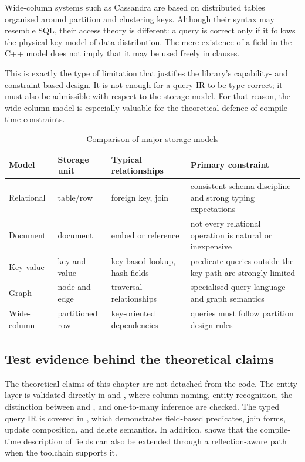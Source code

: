 Wide-column systems such as Cassandra are based on distributed tables organised around partition and clustering keys. Although their syntax may resemble SQL, their access theory is different: a query is correct only if it follows the physical key model of data distribution. The mere existence of a field in the C++ model does not imply that it may be used freely in  clauses.

This is exactly the type of limitation that justifies the library's capability- and constraint-based design. It is not enough for a query IR to be type-correct; it must also be admissible with respect to the storage model. For that reason, the wide-column model is especially valuable for the theoretical defence of compile-time constraints.

\begin{table}[H]
\centering
\small
\caption{Comparison of major storage models}
\label{tab:storage_models}
\begin{tabularx}{\textwidth}{L{2.3cm}L{2.7cm}L{2.8cm}Y}
\toprule
\textbf{Model} & \textbf{Storage unit} & \textbf{Typical relationships} & \textbf{Primary constraint} \\
\midrule
Relational & table/row & foreign key, join & consistent schema discipline and strong typing expectations \\
Document & document & embed or reference & not every relational operation is natural or inexpensive \\
Key-value & key and value & key-based lookup, hash fields & predicate queries outside the key path are strongly limited \\
Graph & node and edge & traversal relationships & specialised query language and graph semantics \\
Wide-column & partitioned row & key-oriented dependencies & queries must follow partition design rules \\
\bottomrule
\end{tabularx}
\end{table}

\subsection{Test evidence behind the theoretical claims}

The theoretical claims of this chapter are not detached from the code. The entity layer is validated directly in  and , where column naming, entity recognition, the distinction between  and , and one-to-many inference are checked. The typed query IR is covered in , which demonstrates field-based predicates, join forms, update composition, and delete semantics. In addition,  shows that the compile-time description of fields can also be extended through a reflection-aware path when the toolchain supports it.


